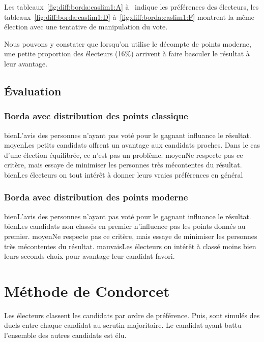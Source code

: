 \documentclass[../report]{subfiles}
\begin{document}
  Les tableaux~\ref{fig:diff:borda:caslim1:A} à~ indique les 
  préférences des électeurs, les tableaux~\ref{fig:diff:borda:caslim1:D} 
  à~\ref{fig:diff:borda:caslim1:F} montrent la même élection avec une tentative de manipulation 
  du vote.

  Nous pouvons y constater que lorsqu'on utilise le décompte de points moderne, une petite 
  proportion des électeurs (16\%) arrivent à faire basculer le résultat à leur avantage.


  \subsection{Évaluation}
  \subsubsection{Borda avec distribution des points classique}
  \tabcritere%
    {bien}{L'avis des personnes n'ayant pas voté pour le gagnant influance le résultat.}%
    {moyen}{Les petits candidats offrent un avantage aux candidats proches. Dans le cas d'une élection équilibrée, ce n'est pas un problème.}%
    {moyen}{Ne respecte pas ce critère, mais essaye de minimiser les personnes très mécontentes du résultat.}%
    {bien}{Les électeurs on tout intérêt à donner leurs vraies préférences en général}
  \subsubsection{Borda avec distribution des points moderne}
  \tabcritere%
    {bien}{L'avis des personnes n'ayant pas voté pour le gagnant influance le résultat.}%
    {bien}{Les candidats non classés en premier n'influence pas les points donnés au premier.}%
    {moyen}{Ne respecte pas ce critère, mais essaye de minimiser les personnes très mécontentes du résultat.}%
    {mauvais}{Les électeurs on intérêt à classé moins bien leurs seconds choix pour avantage leur candidat favori.}


  \section{Méthode de Condorcet}

  Les électeurs classent les candidats par ordre de préférence. 
  Puis, sont simulés des duels entre chaque candidat au scrutin majoritaire.
  Le candidat ayant battu l'ensemble des autres candidats est élu.
\end{document}
